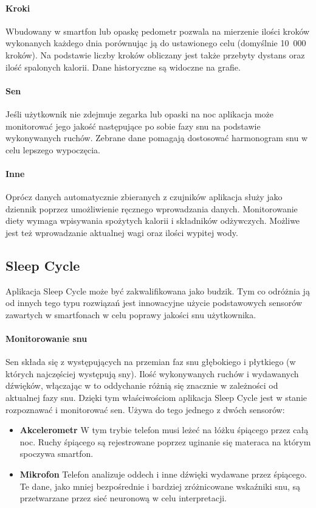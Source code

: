 \paragraph{Kroki} Wbudowany w smartfon lub opaskę pedometr pozwala na mierzenie ilości kroków wykonanych każdego dnia porównując ją do ustawionego celu (domyślnie 10~000 kroków). Na podstawie liczby kroków obliczany jest także przebyty dystans oraz ilość spalonych kalorii. Dane historyczne są widoczne na grafie.

\paragraph{Sen} Jeśli użytkownik nie zdejmuje zegarka lub opaski na noc aplikacja może monitorować jego jakość następujące po sobie fazy snu na podstawie wykonywanych ruchów. Zebrane dane pomagają dostosować harmonogram snu w celu lepszego wypoczęcia.

\paragraph{Inne} Oprócz danych automatycznie zbieranych z czujników aplikacja służy jako dziennik poprzez umożliwienie ręcznego wprowadzania danych. Monitorowanie diety wymaga wpisywania spożytych kalorii i składników odżywczych. Możliwe jest też wprowadzanie aktualnej wagi oraz ilości wypitej wody. 

\subsection{Sleep Cycle}
Aplikacja Sleep Cycle może być zakwalifikowana jako budzik. Tym co odróżnia ją od innych tego typu rozwiązań jest innowacyjne użycie podstawowych sensorów zawartych w smartfonach w celu poprawy jakości snu użytkownika. 

\paragraph{Monitorowanie snu}
Sen składa się z występujących na przemian faz snu głębokiego i płytkiego (w których najczęściej występują sny). Ilość wykonywanych ruchów i wydawanych dźwięków, włączając w to oddychanie różnią się znacznie w zależności od aktualnej fazy snu. Dzięki tym właściwościom aplikacja Sleep Cycle jest w stanie rozpoznawać i monitorować sen. Używa do tego jednego z dwóch sensorów:

\begin{itemize}
	\item {\bf Akcelerometr} W tym trybie telefon musi leżeć na łóżku śpiącego przez całą noc. Ruchy śpiącego są rejestrowane poprzez uginanie się materaca na którym spoczywa smartfon. 
	\item {\bf Mikrofon} Telefon analizuje oddech i inne dźwięki wydawane przez śpiącego. Te dane, jako mniej bezpośrednie i bardziej zróżnicowane wskaźniki snu, są przetwarzane przez sieć neuronową w celu interpretacji.
\end{itemize}

